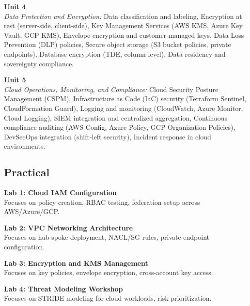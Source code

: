 \noindent\textbf{Unit 4} \\
\textit{Data Protection and Encryption:} Data classification and labeling, Encryption at rest (server-side, client-side), Key Management Services (AWS KMS, Azure Key Vault, GCP KMS), Envelope encryption and customer-managed keys, Data Loss Prevention (DLP) policies, Secure object storage (S3 bucket policies, private endpoints), Database encryption (TDE, column-level), Data residency and sovereignty compliance.

\vspace{0.3cm}

\noindent\textbf{Unit 5} \\
\textit{Cloud Operations, Monitoring, and Compliance:} Cloud Security Posture Management (CSPM), Infrastructure as Code (IaC) security (Terraform Sentinel, CloudFormation Guard), Logging and monitoring (CloudWatch, Azure Monitor, Cloud Logging), SIEM integration and centralized aggregation, Continuous compliance auditing (AWS Config, Azure Policy, GCP Organization Policies), DevSecOps integration (shift-left security), Incident response in cloud environments.

\newpage

\subsection*{Practical}
\noindent\textbf{Lab 1: Cloud IAM Configuration} \\
Focuses on policy creation, RBAC testing, federation setup across AWS/Azure/GCP.

\vspace{0.2cm}

\noindent\textbf{Lab 2: VPC Networking Architecture} \\
Focuses on hub-spoke deployment, NACL/SG rules, private endpoint configuration.

\vspace{0.2cm}

\noindent\textbf{Lab 3: Encryption and KMS Management} \\
Focuses on key policies, envelope encryption, cross-account key access.

\vspace{0.2cm}

\noindent\textbf{Lab 4: Threat Modeling Workshop} \\
Focuses on STRIDE modeling for cloud workloads, risk prioritization.

\vspace{0.2cm}

